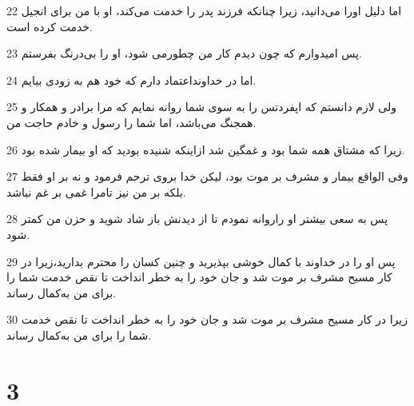 \par 22 اما دلیل اورا می‌دانید، زیرا چنانکه فرزند پدر را خدمت می‌کند، او با من برای انجیل خدمت کرده است.
\par 23 پس امیدوارم که چون دیدم کار من چطورمی شود، او را بی‌درنگ بفرستم.
\par 24 اما در خداونداعتماد دارم که خود هم به زودی بیایم.
\par 25 ولی لازم دانستم که اپفردتس را به سوی شما روانه نمایم که مرا برادر و همکار و همجنگ می‌باشد، اما شما را رسول و خادم حاجت من.
\par 26 زیرا که مشتاق همه شما بود و غمگین شد ازاینکه شنیده بودید که او بیمار شده بود.
\par 27 وفی الواقع بیمار و مشرف بر موت بود، لیکن خدا بروی ترحم فرمود و نه بر او فقط بلکه بر من نیز تامرا غمی بر غم نباشد.
\par 28 پس به سعی بیشتر او راروانه نمودم تا از دیدنش باز شاد شوید و حزن من کمتر شود.
\par 29 پس او را در خداوند با کمال خوشی بپذیرید و چنین کسان را محترم بدارید،زیرا در کار مسیح مشرف بر موت شد و جان خود را به خطر انداخت تا نقص خدمت شما را برای من به‌کمال رساند.
\par 30 زیرا در کار مسیح مشرف بر موت شد و جان خود را به خطر انداخت تا نقص خدمت شما را برای من به‌کمال رساند.

\chapter{3}

